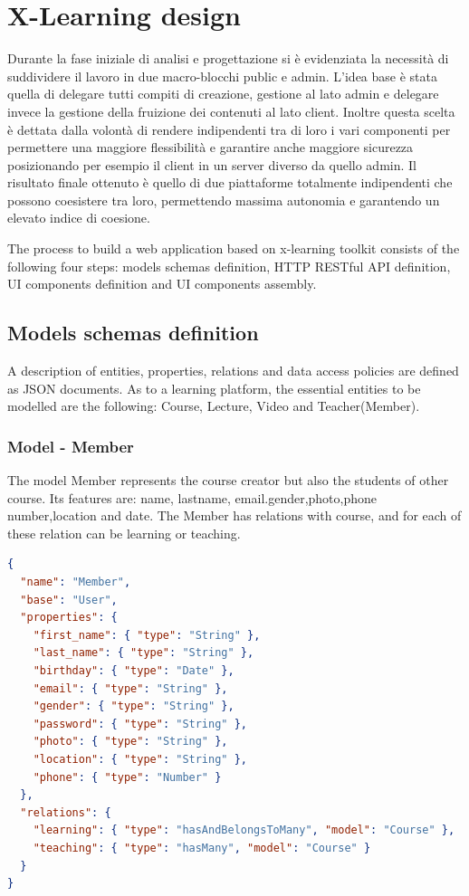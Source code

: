 \section{X-Learning design}
\label{sec:x-learning_design}

  Durante la fase iniziale di analisi e progettazione si è evidenziata la necessità di suddividere il lavoro in due macro-blocchi public e admin. L’idea base è stata quella di delegare tutti compiti di creazione, gestione al lato admin e delegare invece la gestione della fruizione dei contenuti al lato client.
Inoltre questa scelta è dettata dalla volontà di rendere indipendenti tra di loro i vari componenti per permettere una maggiore flessibilità e garantire anche maggiore sicurezza posizionando per esempio il client in un server diverso da quello admin.
Il risultato finale ottenuto è quello di due piattaforme totalmente indipendenti che possono coesistere tra loro, permettendo massima autonomia e garantendo un elevato indice di coesione.


The process to build a web application based on x-learning toolkit consists of the following four steps: models schemas definition, HTTP RESTful API definition, UI components definition and UI components  assembly.


\subsection {Models schemas definition}
\label{subsec:models_schemas_definitio}


A description of entities, properties, relations and data access policies are defined as JSON  documents.
As to a learning platform, the essential entities to be modelled are the following: Course, Lecture, Video and Teacher(Member).

\subsubsection{ Model - Member}

The model Member represents the course creator but also the students of other course. Its features are: name, lastname, email.gender,photo,phone number,location and date. The Member has relations with course, and for each of these relation can be learning or teaching.

\begin{lstlisting}[language=json]
{
  "name": "Member",
  "base": "User",
  "properties": {
    "first_name": { "type": "String" },
    "last_name": { "type": "String" },   
    "birthday": { "type": "Date" },
    "email": { "type": "String" },
    "gender": { "type": "String" },
    "password": { "type": "String" },
    "photo": { "type": "String" },
    "location": { "type": "String" },
    "phone": { "type": "Number" }
  },
  "relations": {
    "learning": { "type": "hasAndBelongsToMany", "model": "Course" },
    "teaching": { "type": "hasMany", "model": "Course" }
  }
}
\end{lstlisting}



